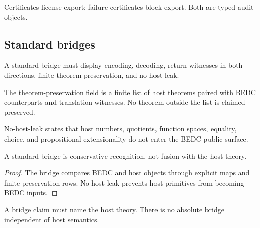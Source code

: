 \begin{corollary}
\label{cor:philosophy-failure-certificate-dual}
Certificates license export; failure certificates block export. Both
are typed audit objects.
\end{corollary}


\subsection{Standard bridges}
\label{subsec:philosophy-standard-bridge-writing}

\begin{definition}
\label{def:philosophy-standard-bridge-writing-form}
A standard bridge must display encoding, decoding, return witnesses in
both directions, finite theorem preservation, and no-host-leak.
\end{definition}

\begin{definition}
\label{def:philosophy-finite-preservation-list}
The theorem-preservation field is a finite list of host theorems paired
with BEDC counterparts and translation witnesses. No theorem outside
the list is claimed preserved.
\end{definition}

\begin{definition}
\label{def:philosophy-no-host-leak-discipline}
No-host-leak states that host numbers, quotients, function spaces,
equality, choice, and propositional extensionality do not enter the
BEDC public surface.
\end{definition}

\begin{theorem}
\label{thm:philosophy-standard-bridge-not-fusion-writing}
A standard bridge is conservative recognition, not fusion with the host
theory.
\end{theorem}
\begin{proof}
The bridge compares BEDC and host objects through explicit maps and
finite preservation rows. No-host-leak prevents host primitives from
becoming BEDC inputs.
\end{proof}

\begin{corollary}
\label{cor:philosophy-bridge-claims-host-relative}
A bridge claim must name the host theory. There is no absolute bridge
independent of host semantics.
\end{corollary}


